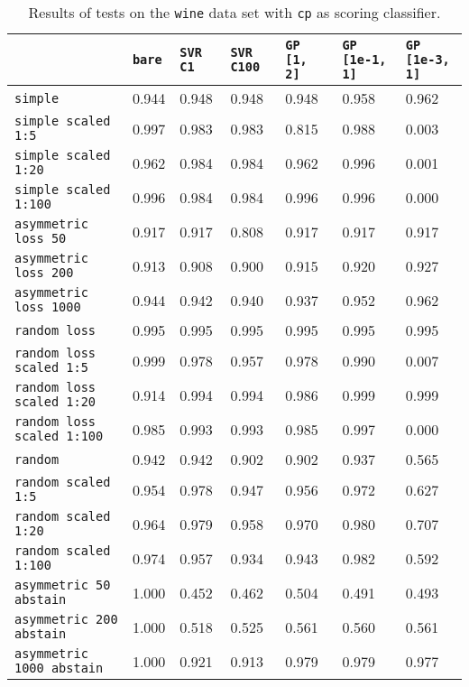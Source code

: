 \begin{table}
{\scriptsize
\begin{tabu}{l|l|l|l|l|l|l}
&\texttt{bare} &\texttt{SVR C1} &\texttt{SVR C100} &\texttt{GP [1, 2]} &\texttt{GP [1e-1, 1]} &\texttt{GP [1e-3, 1]}  \\
\hline
\texttt{simple} &0.944 &0.948 &0.948 &0.948 &0.958 &0.962 \\
\texttt{simple scaled 1:5} &0.997 &0.983 &0.983 &0.815 &0.988 &0.003 \\
\texttt{simple scaled 1:20} &0.962 &0.984 &0.984 &0.962 &0.996 &0.001 \\
\texttt{simple scaled 1:100} &0.996 &0.984 &0.984 &0.996 &0.996 &0.000 \\
\texttt{asymmetric loss 50} &0.917 &0.917 &0.808 &0.917 &0.917 &0.917 \\
\texttt{asymmetric loss 200} &0.913 &0.908 &0.900 &0.915 &0.920 &0.927 \\
\texttt{asymmetric loss 1000} &0.944 &0.942 &0.940 &0.937 &0.952 &0.962 \\
\texttt{random loss} &0.995 &0.995 &0.995 &0.995 &0.995 &0.995 \\
\texttt{random loss scaled 1:5} &0.999 &0.978 &0.957 &0.978 &0.990 &0.007 \\
\texttt{random loss scaled 1:20} &0.914 &0.994 &0.994 &0.986 &0.999 &0.999 \\
\texttt{random loss scaled 1:100} &0.985 &0.993 &0.993 &0.985 &0.997 &0.000 \\
\texttt{random} &0.942 &0.942 &0.902 &0.902 &0.937 &0.565 \\
\texttt{random scaled 1:5} &0.954 &0.978 &0.947 &0.956 &0.972 &0.627 \\
\texttt{random scaled 1:20} &0.964 &0.979 &0.958 &0.970 &0.980 &0.707 \\
\texttt{random scaled 1:100} &0.974 &0.957 &0.934 &0.943 &0.982 &0.592 \\
\texttt{asymmetric 50 abstain} &1.000 &0.452 &0.462 &0.504 &0.491 &0.493 \\
\texttt{asymmetric 200 abstain} &1.000 &0.518 &0.525 &0.561 &0.560 &0.561 \\
\texttt{asymmetric 1000 abstain} &1.000 &0.921 &0.913 &0.979 &0.979 &0.977 \\
\end{tabu} }
\caption{Results of tests on the \texttt{wine} data set
         with \texttt{cp} as scoring classifier.}
\end{table}

